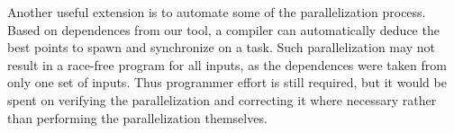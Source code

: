 Another useful extension is to automate some of the parallelization process.
Based on dependences from our tool, a compiler can automatically deduce the best points to spawn and synchronize on a task.
Such parallelization may not result in a race-free program for all inputs, as the dependences were taken from only one set of inputs.
Thus programmer effort is still required, but it would be spent on verifying the parallelization and correcting it where necessary rather than performing the parallelization themselves.

